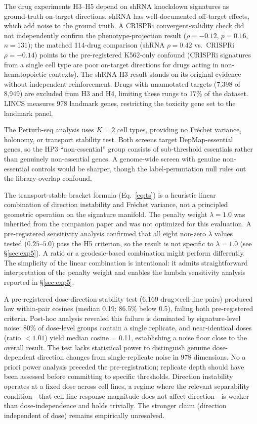 \documentclass[11pt]{article}
\begin{document}
The drug experiments H3--H5 depend on shRNA knockdown signatures as
ground-truth on-target directions. shRNA has well-documented off-target
effects, which add noise to the ground truth. A CRISPRi
convergent-validity check did not
independently confirm the phenotype-projection result ($\rho = -0.12$,
$p = 0.16$, $n = 131$); the matched 114-drug comparison (shRNA
$\rho = 0.42$ vs.\ CRISPRi $\rho = -0.14$) points to the
pre-registered K562-only confound (CRISPRi signatures from a single
cell type are poor on-target directions for drugs acting in
non-hematopoietic contexts). The shRNA H3 result stands on its original evidence without
independent reinforcement. Drugs with unannotated targets
(7{,}398 of 8{,}949) are excluded from H3 and H4, limiting these rungs
to 17\% of the dataset. LINCS measures 978 landmark genes, restricting
the toxicity gene set to the landmark panel.

The Perturb-seq analysis uses $K = 2$ cell types, providing no Fr\'echet
variance, holonomy, or transport stability test. Both screens target
DepMap-essential genes, so the HP3 ``non-essential'' group consists of
sub-threshold essentials rather than genuinely non-essential genes. A
genome-wide screen with genuine non-essential controls would be sharper,
though the label-permutation null rules out the library-overlap confound.

The transport-stable bracket formula (Eq.~\ref{eq:ts}) is a heuristic
linear combination of direction instability and Fr\'echet variance, not a
principled geometric operation on the signature manifold. The penalty
weight $\lambda = 1.0$ was inherited from the companion paper
\citep{tower2026drug} and was not optimized for this evaluation. A
pre-registered sensitivity analysis confirmed that all eight non-zero
$\lambda$ values tested ($0.25$--$5.0$) pass the H5 criterion, so the
result is not specific to $\lambda = 1.0$ (see \S\ref{sec:exp5}).
A ratio or a geodesic-based combination might perform differently.
The simplicity of the linear combination is intentional: it admits
straightforward interpretation of the penalty weight and enables the
lambda sensitivity analysis reported in \S\ref{sec:exp5}.

A pre-registered dose-direction stability test (6{,}169
drug$\times$cell-line pairs) produced low within-pair cosines (median
0.19; 86.5\% below 0.5), failing both pre-registered criteria. Post-hoc
analysis revealed this failure is dominated by signature-level noise:
80\% of dose-level groups contain a single replicate, and
near-identical doses (ratio $< 1.01$) yield median cosine = 0.11,
establishing a noise floor close to the overall result. The test lacks
statistical power to distinguish genuine dose-dependent direction
changes from single-replicate noise in 978 dimensions. No a priori
power analysis preceded the pre-registration; replicate depth should
have been assessed before committing to specific thresholds.
Direction instability operates at a fixed dose across cell lines, a
regime where the relevant separability condition---that cell-line
response magnitude does not affect direction---is weaker than
dose-independence and holds trivially. The stronger claim (direction
independent of dose) remains empirically unresolved.
\end{document}
